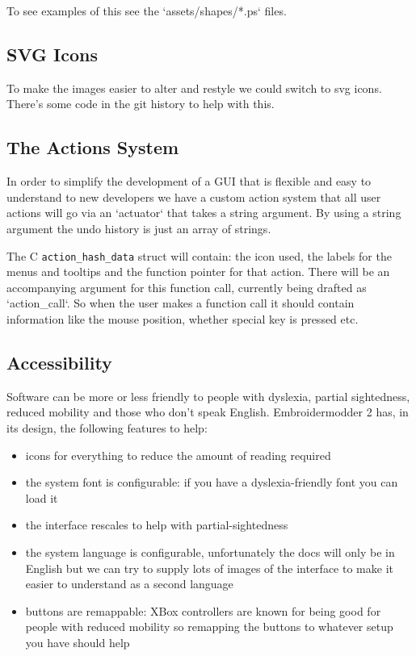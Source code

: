 To see examples of this see the `assets/shapes/*.ps` files.

\subsection{SVG Icons}

To make the images easier to alter and restyle we could switch to svg icons. There's some code
in the git history to help with this.

\subsection{The Actions System}

In order to simplify the development of a GUI that is flexible and easy to understand to new
developers we have a custom action system that all user actions will go via an `actuator` that
takes a string argument. By using a string argument the undo history is just an array of
strings.

The C \texttt{action\_hash\_data} struct will contain: the icon used, the
labels for the menus and tooltips and the function pointer for that action. There will be an
accompanying argument for this function call, currently being drafted as
`action_call`. So when the user makes a function call it should contain
information like the mouse position, whether special key is pressed etc.

\subsection{Accessibility}

Software can be more or less friendly to people with dyslexia, partial sightedness, reduced
mobility and those who don't speak English. Embroidermodder 2 has, in its design, the following
features to help:

\begin{itemize}
\item icons for everything to reduce the amount of reading required
\item the system font is configurable: if you have a dyslexia-friendly font you can load it
\item the interface rescales to help with partial-sightedness
\item the system language is configurable, unfortunately the docs will only be in English but we can try to supply lots of images of the interface to make it easier to understand as a second language
\item buttons are remappable: XBox controllers are known for being good for people with reduced mobility so remapping the buttons to whatever setup you have should help
\end{itemize}

